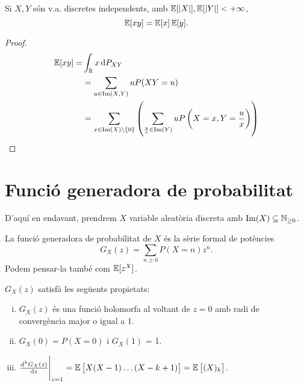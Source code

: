 \begin{lema}
    Si $X,Y$ són v.a. discretes independents, amb $\operatorname{\mathbb{E}}[|X|], \operatorname{\mathbb{E}}[|Y|] < +\infty$,
    \[\operatorname{\mathbb{E}}[xy] = \operatorname{\mathbb{E}}[x]\operatorname{\mathbb{E}}[y].\]
\end{lema}
\begin{proof}
    \[\begin{aligned}
    \esp[xy] =& \int_\real x\dif P_{XY} \\
    &= \sum_{u\in\im(X,Y)}{uP(XY=u)} \\
    &= \sum_{x\in\im(X)\setminus\{0\}} \lp\sum_{\frac{u}{x}\in\im(Y)} uP\lp X=x,Y=\frac{u}{x} \rp\rp
    \end{aligned}\]
\end{proof}


\section{Funció generadora de probabilitat}
D'aquí en endavant, prendrem $X$ variable aleatòria discreta amb $\operatorname{Im}(X) \subseteq \mathbb{N}_{\geq 0}$.
\begin{defi}
    La funció generadora de probabilitat de $X$ \'es la sèrie formal de potències
    \[G_X(z) = \sum_{n \geq 0} P(X = n) z^n.\]
    Podem pensar-la també com $\operatorname{\mathbb{E}}[z^X]$.
\end{defi}

\begin{prop}
    $G_X(z)$ satisfà les següents propietats:
    \begin{enumerate}[i)]
    \item $G_X(z)$ \'es una funció holomorfa al voltant de $z = 0$ amb radi de convergència
        major o igual a $1$.
    \item $G_X(0) = P(X = 0)$ i $G_X(1)$ = 1.
    \item $\eval{\frac{\text{d}^kG_X(z)}{\text{d}z}}_{z = 1} = 
        \esp\lb X(X-1)\dots(X-k+1)\rb = \esp \lb (X)_k\rb $.
    \end{enumerate}
\end{prop}

